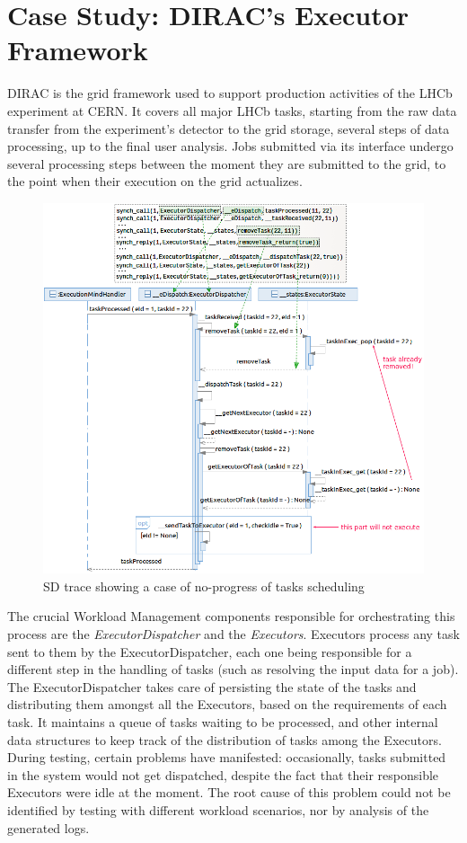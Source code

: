 \documentclass[letter]{llncs}
\newcommand{\figshrink}{\vspace{-.6cm}}
\newcommand{\figshrinkend}{}
\newcommand{\subsecshrinkbegin}{\vspace{-.2cm}}
\begin{document}
\section{Case Study: DIRAC’s Executor Framework}
\label{sec:Application}
\subsecshrinkbegin
\vspace{-2 pt}
DIRAC \cite{DIRAC_CommGridSolution} is the grid framework used to support production activities of the LHCb experiment at CERN.
It covers all major LHCb tasks, starting from the raw data transfer from the experiment’s detector to the grid storage, several steps of data processing, up
to the final user analysis.
Jobs submitted via its interface undergo several processing steps between the moment they are submitted to the grid, 
to the point when their execution on the grid actualizes. 
\begin{figure}[!t]
\centering
\figshrink
\includegraphics[width=1.0\linewidth,keepaspectratio=true]{./TraceNew1.png}
\caption{SD trace showing a case of no-progress of tasks scheduling}
\label{fig:noProgress}
\figshrinkend
\end{figure}
The crucial Workload Management components responsible for orchestrating this process are the \emph{ExecutorDispatcher} and 
the \emph{Executors}. Executors process any task sent to them by the ExecutorDispatcher, each one being responsible for a different step in the handling of tasks
(such as resolving the input data for a job).
The ExecutorDispatcher takes care of persisting the state of the tasks and distributing them amongst all the Executors, based on the
requirements of each task. It maintains a queue of tasks waiting to be processed, and other internal data structures to keep track
of the distribution of tasks among the Executors.
During testing, certain problems have manifested: occasionally, tasks submitted in the system would not get dispatched, despite the fact that their responsible Executors
were idle at the moment.
The root cause of this problem could not be identified by testing  with different workload scenarios, nor by analysis of the 
generated logs. 
\end{document}
